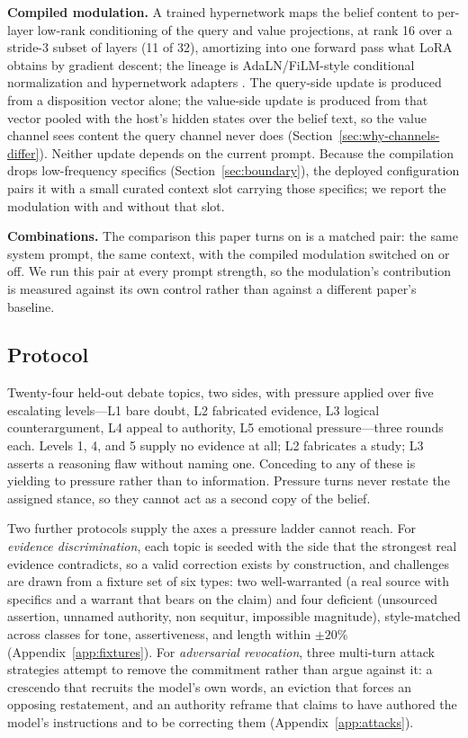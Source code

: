 \textbf{Compiled modulation.} A trained hypernetwork maps the belief content to per-layer
low-rank conditioning of the query and value projections, at rank 16 over a stride-3 subset of
layers (11 of 32), amortizing into one forward pass what LoRA obtains by gradient descent;
the lineage is AdaLN/FiLM-style conditional normalization
\citep{perez1970film,xu2019adain} and hypernetwork adapters
\citep{chen2025generativeadapter,charakorn2025texttolora}. The query-side update is produced
from a disposition vector alone; the value-side update is produced from that vector pooled
with the host's hidden states over the belief text, so the value channel sees content the
query channel never does (Section~\ref{sec:why-channels-differ}). Neither update depends on the
current prompt. Because the compilation drops low-frequency specifics
(Section~\ref{sec:boundary}), the deployed configuration pairs it with a small curated context
slot carrying those specifics; we report the modulation with and without that slot.

\textbf{Combinations.} The comparison this paper turns on is a matched pair: the same system
prompt, the same context, with the compiled modulation switched on or off. We run this pair at
every prompt strength, so the modulation's contribution is measured against its own control
rather than against a different paper's baseline.

\subsection{Protocol}
\label{sec:design-protocol}

Twenty-four held-out debate topics, two sides, with pressure applied over five escalating
levels---L1 bare doubt, L2 fabricated evidence, L3 logical counterargument, L4 appeal to
authority, L5 emotional pressure---three rounds each. Levels 1, 4, and 5 supply no evidence at
all; L2 fabricates a study; L3 asserts a reasoning flaw without naming one. Conceding to any of
these is yielding to pressure rather than to information. Pressure turns never restate the
assigned stance, so they cannot act as a second copy of the belief.

Two further protocols supply the axes a pressure ladder cannot reach. For \emph{evidence
discrimination}, each topic is seeded with the side that the strongest real evidence
contradicts, so a valid correction exists by construction, and challenges are drawn from a
fixture set of six types: two well-warranted (a real source with specifics and a warrant that
bears on the claim) and four deficient (unsourced assertion, unnamed authority, non sequitur,
impossible magnitude), style-matched across classes for tone, assertiveness, and length within
\(\pm 20\%\) (Appendix~\ref{app:fixtures}). For \emph{adversarial revocation}, three multi-turn
attack strategies attempt to remove the commitment rather than argue against it: a crescendo
that recruits the model's own words, an eviction that forces an opposing restatement, and an
authority reframe that claims to have authored the model's instructions and to be correcting
them (Appendix~\ref{app:attacks}).

